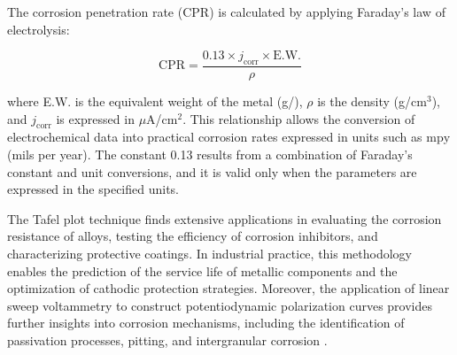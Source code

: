 The corrosion penetration rate (CPR) is calculated by applying Faraday’s law of electrolysis:



\[
\mathrm{CPR} = \frac{0.13 \times j_{\mathrm{corr}} \times \mathrm{E.W.}}{\rho}
\]



where E.W. is the equivalent weight of the metal (g/), $\rho$ is the density (g/cm$^3$), and $j_{\mathrm{corr}}$ is expressed in $\mu$A/cm$^2$. This relationship allows the conversion of electrochemical data into practical corrosion rates expressed in units such as $\mathrm{mpy}$ (mils per year). The constant 0.13 results from a combination of Faraday’s constant and unit conversions, and it is valid only when the parameters are expressed in the specified units.

The Tafel plot technique finds extensive applications in evaluating the corrosion resistance of alloys, testing the efficiency of corrosion inhibitors, and characterizing protective coatings. In industrial practice, this methodology enables the prediction of the service life of metallic components and the optimization of cathodic protection strategies. Moreover, the application of linear sweep voltammetry to construct potentiodynamic polarization curves provides further insights into corrosion mechanisms, including the identification of passivation processes, pitting, and intergranular corrosion \cite{bard2001}.
